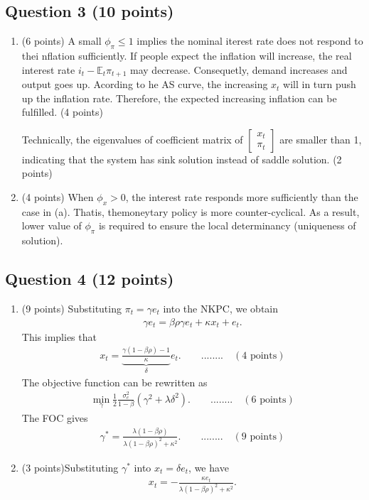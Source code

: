 \documentclass[12pt]{article}
\begin{document}
\subsection*{Question 3 (10 points)}
\begin{enumerate}
    \item (6 points) A small $\phi_\pi \leq 1$ implies the nominal iterest rate does not respond to thei nflation sufficiently. If people expect the inflation will increase, the real interest rate $i_t - \mathbb{E}_t \pi_{t+1}$ may decrease. Consequetly, demand increases and output goes up. Acording to he AS curve, the increasing $x_t$ will in turn push up the inflation rate. Therefore, the expected increasing inflation can be fulfilled. (4 points)
    
    Technically, the eigenvalues of coefficient matrix of $\begin{bmatrix} x_t \\ \pi_t \end{bmatrix}$ are smaller than 1, indicating that the system has sink solution instead of saddle solution. (2 points)

    \item (4 points) When $\phi_x > 0$, the interest rate responds more sufficiently than the case in (a). Thatis, themoneytary policy is more counter-cyclical. As a result, lower value of $\phi_\pi$ is required to ensure the local determinancy (uniqueness of solution).
\end{enumerate}

\subsection*{Question 4 (12 points)}
\begin{enumerate}
    \item (9 points) Substituting $\pi_t = \gamma e_t$ into the NKPC, we obtain
    \begin{align*}
        \gamma e_t = \beta \rho \gamma e_t + \kappa x_t + e_t.
    \end{align*}
    This implies that 
    \begin{align*}
        x_t = \underbrace{\frac{\gamma (1-\beta \rho) -1}{\kappa}}_{\delta} e_t. \qquad ........ \quad(4 \text{ points})
    \end{align*}
    The objective function can be rewritten as
    \begin{align*}
        \min_{\gamma} \frac{1}{2} \frac{\sigma_e^2}{1-\beta} (\gamma^2 + \lambda \delta^2). \qquad ........ \quad(6 \text{ points})
    \end{align*}
    The FOC gives
    \begin{align*}
        \gamma^* = \frac{\lambda(1-\beta\rho)}{\lambda(1-\beta\rho)^2 + \kappa^2}. \qquad ........ \quad(9 \text{ points})
    \end{align*}

    \item (3 points)Substituting $\gamma^*$ into $x_t = \delta e_t$, we have
    \begin{align*}
        x_t = -\frac{\kappa e_t}{\lambda(1-\beta\rho)^2 + \kappa^2}.
    \end{align*}
\end{enumerate}
\end{document}
